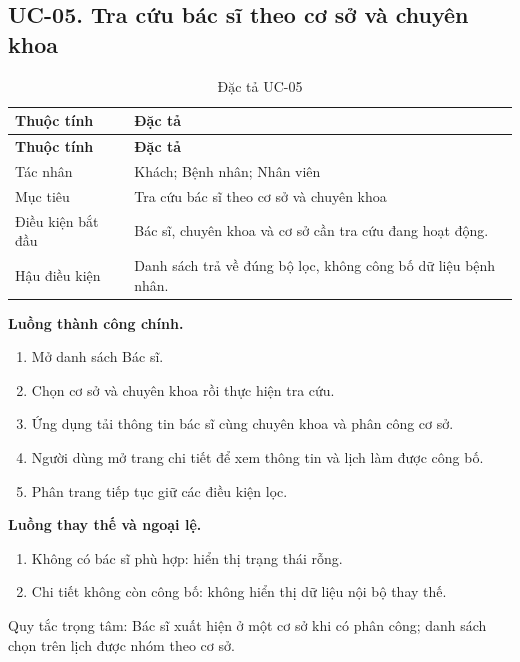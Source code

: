 \subsection{UC-05.\allowbreak{} Tra cứu bác sĩ theo cơ sở và chuyên khoa}
\label{uc:5}

{\small\setlength{\tabcolsep}{3pt}\renewcommand{\arraystretch}{1.12}
\begin{longtable}{@{}L{\textwidth-1.32pt\relax} L{\textwidth-4.68pt\relax}@{}}
\caption{Đặc tả UC-05}\\
\toprule
\textbf{Thuộc tính} & \textbf{Đặc tả}\\\midrule
\endfirsthead
\toprule
\textbf{Thuộc tính} & \textbf{Đặc tả}\\\midrule
\endhead
\bottomrule\endlastfoot
Tác nhân & Khách; Bệnh nhân; Nhân viên\\[3pt]
Mục tiêu & Tra cứu bác sĩ theo cơ sở và chuyên khoa\\[3pt]
Điều kiện bắt đầu & Bác sĩ, chuyên khoa và cơ sở cần tra cứu đang hoạt động.\allowbreak{}\\[3pt]
Hậu điều kiện & Danh sách trả về đúng bộ lọc, không công bố dữ liệu bệnh nhân.\allowbreak{}\\[3pt]
\end{longtable}}
\noindent\textbf{Luồng thành công chính.}
\begin{enumerate}
\item Mở danh sách Bác sĩ.\allowbreak{}
\item Chọn cơ sở và chuyên khoa rồi thực hiện tra cứu.\allowbreak{}
\item Ứng dụng tải thông tin bác sĩ cùng chuyên khoa và phân công cơ sở.\allowbreak{}
\item Người dùng mở trang chi tiết để xem thông tin và lịch làm được công bố.\allowbreak{}
\item Phân trang tiếp tục giữ các điều kiện lọc.\allowbreak{}
\end{enumerate}
\noindent\textbf{Luồng thay thế và ngoại lệ.}
\begin{enumerate}
\item Không có bác sĩ phù hợp:\allowbreak{} hiển thị trạng thái rỗng.\allowbreak{}
\item Chi tiết không còn công bố:\allowbreak{} không hiển thị dữ liệu nội bộ thay thế.\allowbreak{}
\end{enumerate}
Quy tắc trọng tâm:\allowbreak{} Bác sĩ xuất hiện ở một cơ sở khi có phân công; danh sách chọn trên lịch được nhóm theo cơ sở.\allowbreak{}

